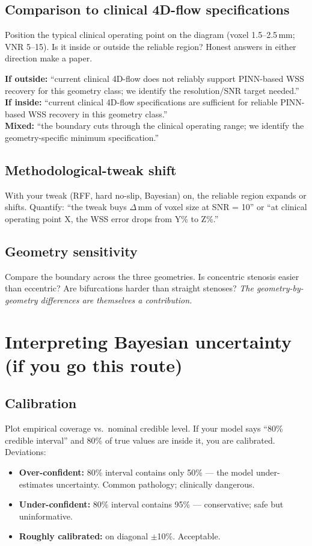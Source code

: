 \documentclass[11pt]{article}
\begin{document}
\subsection*{Comparison to clinical 4D-flow specifications}
Position the typical clinical operating point on the diagram (voxel 1.5--2.5\,mm; VNR 5--15). Is it inside or outside the reliable region? Honest answers in either direction make a paper.

\textbf{If outside:} ``current clinical 4D-flow does not reliably support PINN-based WSS recovery for this geometry class; we identify the resolution/SNR target needed.''\\
\textbf{If inside:} ``current clinical 4D-flow specifications are sufficient for reliable PINN-based WSS recovery in this geometry class.''\\
\textbf{Mixed:} ``the boundary cuts through the clinical operating range; we identify the geometry-specific minimum specification.''

\subsection*{Methodological-tweak shift}
With your tweak (RFF, hard no-slip, Bayesian) on, the reliable region expands or shifts. Quantify: ``the tweak buys $\Delta$\,mm of voxel size at SNR = 10'' or ``at clinical operating point X, the WSS error drops from Y\% to Z\%.''

\subsection*{Geometry sensitivity}
Compare the boundary across the three geometries. Is concentric stenosis easier than eccentric? Are bifurcations harder than straight stenoses? \emph{The geometry-by-geometry differences are themselves a contribution.}

\section{Interpreting Bayesian uncertainty (if you go this route)}

\subsection*{Calibration}
Plot empirical coverage vs.\ nominal credible level. If your model says ``80\% credible interval'' and 80\% of true values are inside it, you are calibrated. Deviations:
\begin{itemize}[noitemsep]
\item \textbf{Over-confident:} 80\% interval contains only 50\% --- the model under-estimates uncertainty. Common pathology; clinically dangerous.
\item \textbf{Under-confident:} 80\% interval contains 95\% --- conservative; safe but uninformative.
\item \textbf{Roughly calibrated:} on diagonal $\pm$10\%. Acceptable.
\end{itemize}
\end{document}
